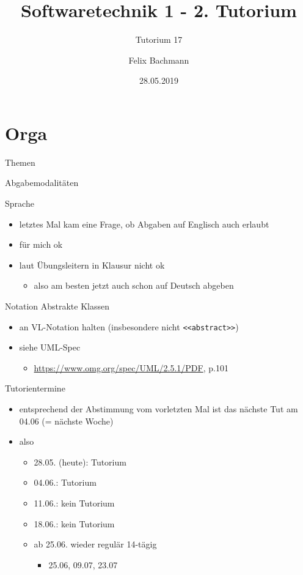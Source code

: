 \documentclass[18pt]{beamer}
\title[SWT1]{Softwaretechnik 1 - 2. Tutorium}
\subtitle{Tutorium 17}
\author{Felix Bachmann}
\date{28.05.2019}
\institute{KIT - Institut für Programmstrukturen und Datenorganisation (IPD)}
\begin{document}

\begin{frame}
\titlepage
\end{frame}

\section{Orga}

\begin{frame}{Themen}
\tableofcontents
\end{frame}

\begin{frame}[fragile]{Abgabemodalitäten}
	\begin{block}{Sprache}
		\begin{itemize}
			\item letztes Mal kam eine Frage, ob Abgaben auf Englisch auch erlaubt
			\item für mich ok
			\item laut Übungsleitern in Klausur nicht ok
			\begin{itemize}
				\item also am besten jetzt auch schon auf Deutsch abgeben
			\end{itemize}
		\end{itemize}
	\end{block}
	\begin{block}{Notation Abstrakte Klassen}
		\begin{itemize}
			\item an VL-Notation halten (insbesondere nicht \verb|<<abstract>>|)
			\item siehe UML-Spec 
			\begin{itemize}
				\item \url{https://www.omg.org/spec/UML/2.5.1/PDF}, p.101
			\end{itemize}
		\end{itemize}
	\end{block}
\end{frame}

\begin{frame}{Tutorientermine}
	\begin{itemize}
		\item entsprechend der Abstimmung vom vorletzten Mal ist das nächste Tut am 04.06 (= nächste Woche)
		\item also
		\begin{itemize}
			\item 28.05. (heute): Tutorium
			\item 04.06.: Tutorium
			\item 11.06.: kein Tutorium
			\item 18.06.: kein Tutorium
			\item ab 25.06. wieder regulär 14-tägig
			\begin{itemize}
				\item 25.06, 09.07, 23.07
			\end{itemize}
		\end{itemize}
	\end{itemize}
\end{frame}
\end{document}
